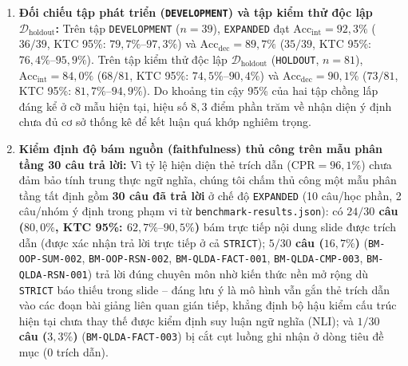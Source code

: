 \documentclass{IEEEtran}
\begin{document}
\begin{enumerate}
    \item \textbf{Đối chiếu tập phát triển (\texttt{DEVELOPMENT}) và tập kiểm thử độc lập $\mathcal{D}_{\text{holdout}}$:} Trên tập \texttt{DEVELOPMENT} ($n = 39$), \texttt{EXPANDED} đạt $\text{Acc}_{\text{int}} = 92{,}3\%$ ($36/39$, KTC 95\%: $79{,}7\%\text{--}97{,}3\%$) và $\text{Acc}_{\text{dec}} = 89{,}7\%$ ($35/39$, KTC 95\%: $76{,}4\%\text{--}95{,}9\%$). Trên tập kiểm thử độc lập $\mathcal{D}_{\text{holdout}}$ (\texttt{HOLDOUT}, $n = 81$), $\text{Acc}_{\text{int}} = 84{,}0\%$ ($68/81$, KTC 95\%: $74{,}5\%\text{--}90{,}4\%$) và $\text{Acc}_{\text{dec}} = 90{,}1\%$ ($73/81$, KTC 95\%: $81{,}7\%\text{--}94{,}9\%$). Do khoảng tin cậy 95\% của hai tập chồng lấp đáng kể ở cỡ mẫu hiện tại, hiệu số $8{,}3$ điểm phần trăm về nhận diện ý định chưa đủ cơ sở thống kê để kết luận quá khớp nghiêm trọng.
    \item \textbf{Kiểm định độ bám nguồn (faithfulness) thủ công trên mẫu phân tầng 30 câu trả lời:} Vì tỷ lệ hiện diện thẻ trích dẫn ($\text{CPR} = 96{,}1\%$) chưa đảm bảo tính trung thực ngữ nghĩa, chúng tôi chấm thủ công một mẫu phân tầng tất định gồm \textbf{30 câu đã trả lời} ở chế độ \texttt{EXPANDED} (10 câu/học phần, 2 câu/nhóm ý định trong phạm vi từ \texttt{benchmark-results.json}): có \textbf{$24/30$ câu ($80{,}0\%$, KTC 95\%: $62{,}7\%\text{--}90{,}5\%$)} bám trực tiếp nội dung slide được trích dẫn (được xác nhận trả lời trực tiếp ở cả \texttt{STRICT}); \textbf{$5/30$ câu ($16{,}7\%$)} (\texttt{BM-OOP-SUM-002}, \texttt{BM-OOP-RSN-002}, \texttt{BM-QLDA-FACT-001}, \texttt{BM-QLDA-CMP-003}, \texttt{BM-QLDA-RSN-001}) trả lời đúng chuyên môn nhờ kiến thức nền mở rộng dù \texttt{STRICT} báo thiếu trong slide -- đáng lưu ý là mô hình vẫn gắn thẻ trích dẫn vào các đoạn bài giảng liên quan gián tiếp, khẳng định bộ hậu kiểm cấu trúc hiện tại chưa thay thế được kiểm định suy luận ngữ nghĩa (NLI); và \textbf{$1/30$ câu ($3{,}3\%$)} (\texttt{BM-QLDA-FACT-003}) bị cắt cụt luồng ghi nhận ở dòng tiêu đề mục ($0$ trích dẫn).

\end{enumerate}
\end{document}
